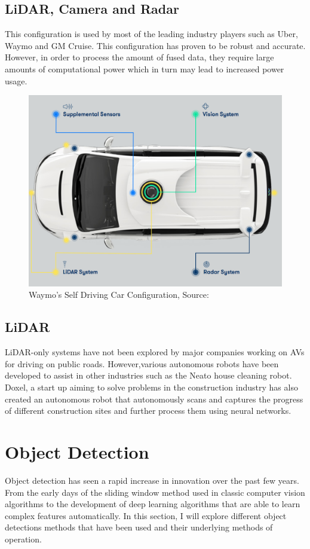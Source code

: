 \subsection{LiDAR, Camera and Radar}
This configuration is used by most of the leading industry players such as Uber, Waymo and GM Cruise. This configuration has proven to be robust and accurate. However, in order to process the amount of fused data, they require large amounts of computational power which in turn may lead to increased power usage. 
\begin{figure}[t]
	\centering
	\includegraphics[width=\textwidth]{media/waymo.png}
	\caption{Waymo's Self Driving Car Configuration, Source:\cite{waymo_2018}}
	\label{fig:waymo}
\end{figure}
\subsection{LiDAR }
LiDAR-only systems have not been explored by major companies working on AVs for driving on public roads. However,various autonomous robots have been developed to assist in other industries such as the Neato house cleaning robot. Doxel, a start up aiming to solve problems in the construction industry has also created an autonomous robot that autonomously scans and captures the progress of different construction sites and further process them using neural networks.
\section{Object  Detection} 
Object detection has seen a rapid increase in innovation over the past few years. From the early days of the sliding window method used in classic computer vision algorithms to the development of deep learning algorithms that are able to learn complex features automatically. 
In this section, I will explore different object detections methods that have been used and their underlying methods of operation.

